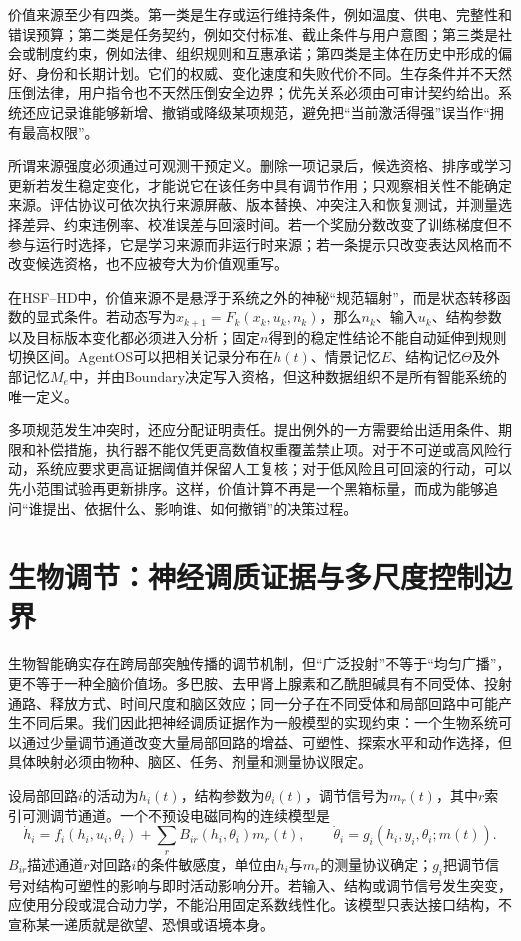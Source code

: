 价值来源至少有四类。第一类是生存或运行维持条件，例如温度、供电、完整性和错误预算；第二类是任务契约，例如交付标准、截止条件与用户意图；第三类是社会或制度约束，例如法律、组织规则和互惠承诺；第四类是主体在历史中形成的偏好、身份和长期计划。它们的权威、变化速度和失败代价不同。生存条件并不天然压倒法律，用户指令也不天然压倒安全边界；优先关系必须由可审计契约给出。系统还应记录谁能够新增、撤销或降级某项规范，避免把“当前激活得强”误当作“拥有最高权限”。

所谓来源强度必须通过可观测干预定义。删除一项记录后，候选资格、排序或学习更新若发生稳定变化，才能说它在该任务中具有调节作用；只观察相关性不能确定来源。评估协议可依次执行来源屏蔽、版本替换、冲突注入和恢复测试，并测量选择差异、约束违例率、校准误差与回滚时间。若一个奖励分数改变了训练梯度但不参与运行时选择，它是学习来源而非运行时来源；若一条提示只改变表达风格而不改变候选资格，也不应被夸大为价值观重写。

在HSF--HD中，价值来源不是悬浮于系统之外的神秘“规范辐射”，而是状态转移函数的显式条件。若动态写为$x_{k+1}=F_k(x_k,u_k,n_k)$，那么$n_k$、输入$u_k$、结构参数以及目标版本变化都必须进入分析；固定$n$得到的稳定性结论不能自动延伸到规则切换区间。AgentOS可以把相关记录分布在$h(t)$、情景记忆$E$、结构记忆$\Theta$及外部记忆$M_e$中，并由Boundary决定写入资格，但这种数据组织不是所有智能系统的唯一定义。

多项规范发生冲突时，还应分配证明责任。提出例外的一方需要给出适用条件、期限和补偿措施，执行器不能仅凭更高数值权重覆盖禁止项。对于不可逆或高风险行动，系统应要求更高证据阈值并保留人工复核；对于低风险且可回滚的行动，可以先小范围试验再更新排序。这样，价值计算不再是一个黑箱标量，而成为能够追问“谁提出、依据什么、影响谁、如何撤销”的决策过程。

\section{生物调节：神经调质证据与多尺度控制边界}
\label{sec:bio_gauge_source}

生物智能确实存在跨局部突触传播的调节机制，但“广泛投射”不等于“均匀广播”，更不等于一种全脑价值场。多巴胺、去甲肾上腺素和乙酰胆碱具有不同受体、投射通路、释放方式、时间尺度和脑区效应；同一分子在不同受体和局部回路中可能产生不同后果。我们因此把神经调质证据作为一般模型的实现约束：一个生物系统可以通过少量调节通道改变大量局部回路的增益、可塑性、探索水平和动作选择，但具体映射必须由物种、脑区、任务、剂量和测量协议限定。

设局部回路$i$的活动为$h_i(t)$，结构参数为$\theta_i(t)$，调节信号为$m_r(t)$，其中$r$索引可测调节通道。一个不预设电磁同构的连续模型是
\[
\dot h_i=f_i(h_i,u_i,\theta_i)+\sum_r B_{ir}(h_i,\theta_i)m_r(t),
\qquad \dot\theta_i=g_i(h_i,y_i,\theta_i;m(t)).
\]
$B_{ir}$描述通道$r$对回路$i$的条件敏感度，单位由$h_i$与$m_r$的测量协议确定；$g_i$把调节信号对结构可塑性的影响与即时活动影响分开。若输入、结构或调节信号发生突变，应使用分段或混合动力学，不能沿用固定系数线性化。该模型只表达接口结构，不宣称某一递质就是欲望、恐惧或语境本身。

